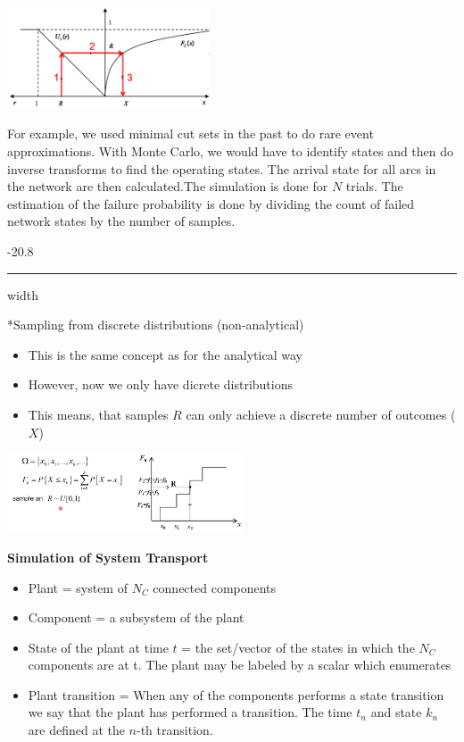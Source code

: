\documentclass[8pt, landscape, fleqn]{scrartcl}
\makeatletter
\renewcommand{\subsubsection}{\@startsection{subsubsection}{1}{0mm}%
{-2\baselineskip}{0.8\baselineskip}%
{\hrule depth 0.2pt width\columnwidth\vspace*{1.2em}\normalsize\bfseries\rmfamily}}
\makeatother
\begin{document}
\begin{multicols*}{3}
\begin{center}
\includegraphics[width=6cm]{Images/Inverse-Transform.png}
\end{center}

For example, we used minimal cut sets in the past to do rare event approximations. With Monte Carlo, we would have to identify states and then do inverse transforms to find the operating states. The arrival state for all arcs in the network are then calculated.The simulation is done for $N$ trials. The estimation of the failure probability is done by dividing the count of failed network states by the number of samples.

\subsubsection*{Sampling from discrete distributions (non-analytical)}

\begin{itemize}
    \item This is the same concept as for the analytical way
    \item However, now we only have dicrete distributions 
    \item This means, that samples $R$ can only achieve a discrete number of outcomes ($X$)
\end{itemize}

\begin{center}
\includegraphics[width=7cm]{Images/Sampling_Discrete.png}
\end{center}


\textbf{Simulation of System Transport}

\begin{itemize}
\item Plant = system of $N_C$ connected components
\item Component = a subsystem of the plant
\item State of the plant at time $t$ = the set/vector of the states in which the $N_C$ components are at t. The plant may be labeled by a scalar which enumerates 
\item Plant transition = When any of the components performs a state transition we say that the plant has performed a transition. The time $t_n$ and state $k_n$ are defined at the $n$-th transition. 
\end{itemize} 



\end{multicols*}
\end{document}
